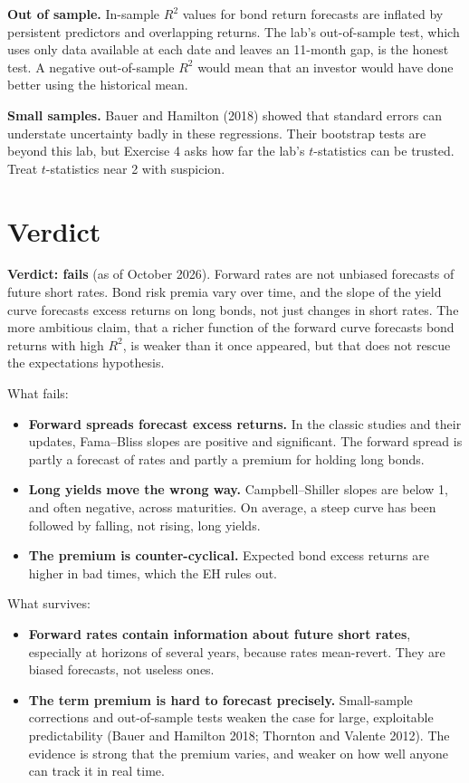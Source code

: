 \textbf{Out of sample.} In-sample $R^2$ values for bond return forecasts are inflated by persistent predictors and overlapping returns. The lab's out-of-sample test, which uses only data available at each date and leaves an 11-month gap, is the honest test. A negative out-of-sample $R^2$ would mean that an investor would have done better using the historical mean.

\textbf{Small samples.} Bauer and Hamilton (2018) showed that standard errors can understate uncertainty badly in these regressions. Their bootstrap tests are beyond this lab, but Exercise 4 asks how far the lab's $t$-statistics can be trusted. Treat $t$-statistics near 2 with suspicion.

\section{Verdict}
\label{sec:16-verdict}

\begin{callout}
\textbf{Verdict: fails} (as of October 2026). Forward rates are not unbiased forecasts of future short rates. Bond risk premia vary over time, and the slope of the yield curve forecasts excess returns on long bonds, not just changes in short rates. The more ambitious claim, that a richer function of the forward curve forecasts bond returns with high $R^2$, is weaker than it once appeared, but that does not rescue the expectations hypothesis.
\end{callout}

What fails:

\begin{itemize}
  \item \textbf{Forward spreads forecast excess returns.} In the classic studies and their updates, Fama--Bliss slopes are positive and significant. The forward spread is partly a forecast of rates and partly a premium for holding long bonds.
  \item \textbf{Long yields move the wrong way.} Campbell--Shiller slopes are below 1, and often negative, across maturities. On average, a steep curve has been followed by falling, not rising, long yields.
  \item \textbf{The premium is counter-cyclical.} Expected bond excess returns are higher in bad times, which the EH rules out.
\end{itemize}

What survives:

\begin{itemize}
  \item \textbf{Forward rates contain information about future short rates}, especially at horizons of several years, because rates mean-revert. They are biased forecasts, not useless ones.
  \item \textbf{The term premium is hard to forecast precisely.} Small-sample corrections and out-of-sample tests weaken the case for large, exploitable predictability (Bauer and Hamilton 2018; Thornton and Valente 2012). The evidence is strong that the premium varies, and weaker on how well anyone can track it in real time.
\end{itemize}


